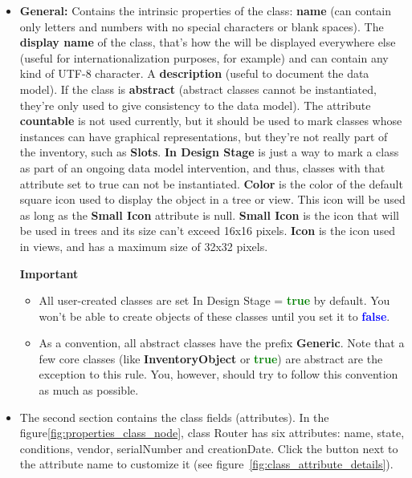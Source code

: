 \documentclass[a4paper]{article}
\begin{document}
		\begin{itemize}
			\item \textbf{General:} Contains the intrinsic properties  of  the class: \textbf{name} (can contain only letters and numbers with no special characters  or  blank  spaces). The  \textbf{display name} of the class, that's how the  will be displayed everywhere else (useful  for  internationalization  purposes, for example) and can contain any kind of UTF-8 character. A \textbf{description} (useful  to  document  the  data  model). If  the class is \textbf{abstract} (abstract classes  cannot  be  instantiated, they're only used to give consistency to the  data  model). The attribute \textbf{countable} is not used currently, but it should be used to mark classes whose instances can have graphical representations, but  they're  not really  part  of  the  inventory,  such  as  \textbf{Slots}. \textbf{In Design Stage} is just a way to mark a class as part of an ongoing data model intervention, and thus, classes with that attribute set to true can not be instantiated. \textbf{Color} is the color of the default square icon used to display the object in a tree or view. This icon will be used as long as the \textbf{Small Icon} attribute is null. \textbf{Small Icon} is the icon that will be used in trees and its size can't exceed 16x16 pixels. \textbf{Icon} is the icon used in views, and has a maximum size of 32x32 pixels.
			\begin{framed} {\large \textbf{Important}}
				\begin{itemize}
					\item All user-created classes are set In Design Stage = \textbf{\textcolor{green}{true}} by default. You won't be able to create objects of these classes until you set it to \textbf{\textcolor{blue}{false}}.
					\item As a convention, all abstract classes have the prefix \textbf{Generic}. Note that a few core classes (like \textbf{InventoryObject} or \textbf{\textcolor{green}{true}}) are abstract are the exception to this rule. You, however, should try to follow this convention as much as possible.
				\end{itemize}
			\end{framed}
			\item The second section  contains the class fields (attributes). In the  figure\ref{fig:properties_class_node}, class Router  has six attributes: name, state, conditions, vendor, serialNumber and creationDate. Click the button next to the attribute name to customize it (see figure~\ref{fig:class_attribute_details}).

\end{itemize}
\end{document}

